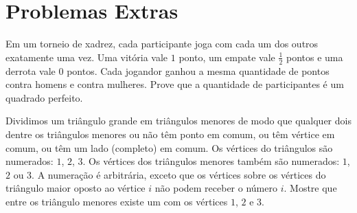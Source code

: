 \documentclass[10pt, a4paper]{article}
\begin{document}




	



	\section{Problemas Extras}

	\begin{prob}[OBM] %
		Em um torneio de xadrez, cada participante joga com cada um dos outros exatamente uma vez. Uma vitória vale $1$ ponto, um empate vale $\frac{1}{2}$ pontos e uma derrota vale $0$ pontos. Cada jogandor ganhou a mesma quantidade de pontos contra homens e contra mulheres. Prove que a quantidade de participantes é um quadrado perfeito.
	\end{prob}

	\begin{prob} %
		Dividimos um triângulo grande em triângulos menores de modo que qualquer dois dentre os triângulos menores ou não têm ponto em comum, ou têm vértice em comum, ou têm um lado (completo) em comum. Os vértices do triângulos são numerados: $1$, $2$, $3$. Os vértices dos triângulos menores também são numerados: $1$, $2$ ou $3$. A numeração é arbitrária, exceto que os vértices sobre os vértices do triângulo maior oposto ao vértice $i$ não podem receber o número $i$. Mostre que entre os triângulo menores existe um com os vértices $1$, $2$ e $3$.
	\end{prob}
\end{document}

